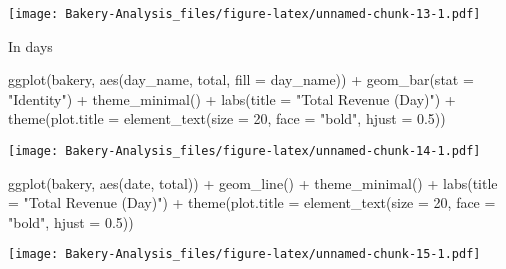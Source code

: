 \documentclass[
]{article}
\newenvironment{Shaded}{\begin{snugshade}}{\end{snugshade}}
\newcommand{\AttributeTok}[1]{\textcolor[rgb]{0.77,0.63,0.00}{#1}}
\newcommand{\DecValTok}[1]{\textcolor[rgb]{0.00,0.00,0.81}{#1}}
\newcommand{\FloatTok}[1]{\textcolor[rgb]{0.00,0.00,0.81}{#1}}
\newcommand{\FunctionTok}[1]{\textcolor[rgb]{0.00,0.00,0.00}{#1}}
\newcommand{\NormalTok}[1]{#1}
\newcommand{\SpecialCharTok}[1]{\textcolor[rgb]{0.00,0.00,0.00}{#1}}
\newcommand{\StringTok}[1]{\textcolor[rgb]{0.31,0.60,0.02}{#1}}
\begin{document}
\texttt{[image: Bakery-Analysis\_files/figure-latex/unnamed-chunk-13-1.pdf]}

In days

\begin{Shaded}
\begin{Highlighting}[]
\FunctionTok{ggplot}\NormalTok{(bakery, }\FunctionTok{aes}\NormalTok{(day\_name, total, }\AttributeTok{fill =}\NormalTok{ day\_name)) }\SpecialCharTok{+} \FunctionTok{geom\_bar}\NormalTok{(}\AttributeTok{stat =} \StringTok{"Identity"}\NormalTok{) }\SpecialCharTok{+} \FunctionTok{theme\_minimal}\NormalTok{() }\SpecialCharTok{+} \FunctionTok{labs}\NormalTok{(}\AttributeTok{title =} \StringTok{"Total Revenue (Day)"}\NormalTok{) }\SpecialCharTok{+} \FunctionTok{theme}\NormalTok{(}\AttributeTok{plot.title =} \FunctionTok{element\_text}\NormalTok{(}\AttributeTok{size =} \DecValTok{20}\NormalTok{, }\AttributeTok{face =} \StringTok{"bold"}\NormalTok{, }\AttributeTok{hjust =} \FloatTok{0.5}\NormalTok{))}
\end{Highlighting}
\end{Shaded}

\texttt{[image: Bakery-Analysis\_files/figure-latex/unnamed-chunk-14-1.pdf]}

\begin{Shaded}
\begin{Highlighting}[]
\FunctionTok{ggplot}\NormalTok{(bakery, }\FunctionTok{aes}\NormalTok{(date, total)) }\SpecialCharTok{+} \FunctionTok{geom\_line}\NormalTok{() }\SpecialCharTok{+} \FunctionTok{theme\_minimal}\NormalTok{() }\SpecialCharTok{+} \FunctionTok{labs}\NormalTok{(}\AttributeTok{title =} \StringTok{"Total Revenue (Day)"}\NormalTok{) }\SpecialCharTok{+} \FunctionTok{theme}\NormalTok{(}\AttributeTok{plot.title =} \FunctionTok{element\_text}\NormalTok{(}\AttributeTok{size =} \DecValTok{20}\NormalTok{, }\AttributeTok{face =} \StringTok{"bold"}\NormalTok{, }\AttributeTok{hjust =} \FloatTok{0.5}\NormalTok{))}
\end{Highlighting}
\end{Shaded}

\texttt{[image: Bakery-Analysis\_files/figure-latex/unnamed-chunk-15-1.pdf]}
\end{document}
